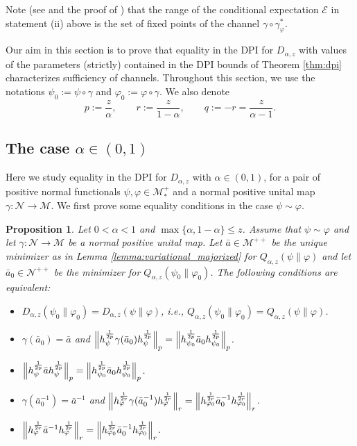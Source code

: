 \documentclass[12pt]{article}
\newtheorem{prop}[theorem]{Proposition}
\theoremstyle{definition}
\theoremstyle{remark}
\numberwithin{equation}{section}
\def\Me{\mathcal M}
\def\Ne{\mathcal N}
\def\ffi{\varphi}
\begin{document}
Note {(see \cite[Theorem 2]{petz1988sufficiency} and the proof of
\cite[Theorem 3]{petz1988sufficiency})}
that the range of the conditional expectation $\mathcal E$ in statement (ii) above is the set of
fixed points of the channel $\gamma\circ\gamma_\varphi^*$.


Our aim in this section is to prove that equality in the DPI for $D_{\alpha,z}$ with 
values of the parameters (strictly) contained in the DPI bounds of Theorem \ref{thm:dpi}
characterizes sufficiency of channels. Throughout this section, we use the
notations $\psi_0:=\psi\circ\gamma$ and $\ffi_0:=\ffi\circ\gamma$. We also denote
\[
p:=\frac{z}{\alpha},\qquad r:=\frac{z}{1-\alpha},\qquad q:=-r=\frac{z}{\alpha-1}. 
\]


\subsection{The case $\alpha\in (0,1)$}

Here we study equality in the DPI for $D_{\alpha,z}$ with $\alpha\in (0,1)$,  for a pair of positive
normal functionals $\psi,\ffi\in \Me_*^+$ and a normal positive unital map $\gamma:\Ne\to \Me$. We first
prove some equality conditions  in the case $\psi\sim \ffi$. 

\begin{prop}\label{prop:DPI_equality}
Let $0<\alpha<1$ and $\max\{\alpha,1-\alpha\}\le z$.  Assume that $\psi\sim \ffi$ and  let
$\gamma:\Ne\to \Me$ be a normal positive unital map. Let 
$\bar a\in \Me^{++}$  
be the unique minimizer as in Lemma \ref{lemma:variational_majorized} for
$Q_{\alpha,z}(\psi\|\ffi)$ and let $\bar a_0\in \Ne^{++}$ be the minimizer for
$Q_{\alpha,z}(\psi_0\|\ffi_0)$. The following conditions are equivalent:
\begin{itemize}
\item[(i)] $D_{\alpha,z}(\psi_0\|\ffi_0)=D_{\alpha,z}(\psi\|\ffi)$, i.e.,
$Q_{\alpha,z}(\psi_0\|\ffi_0)=Q_{\alpha,z}(\psi\|\ffi)$.
\item[(ii)] $\gamma(\bar a_0)=\bar a$ and
$\Big\|h_\psi^{1\over2p}\gamma(\bar a_0)h_\psi^{1\over2p}\Big\|_{p}
=\Big\|h_{\psi_0}^{1\over2p}\bar a_0h_{\psi_0}^{1\over2p}\Big\|_{p}$.
\item[(iii)] $\Big\|h_\psi^{1\over2p}\bar ah_\psi^{1\over2p}\Big\|_{p}
=\Big\|h_{\psi_0}^{1\over2p}\bar a_0h_{\psi_0}^{1\over2p}\Big\|_{p}$.
\item[(iv)] $\gamma(\bar a_0^{-1})=\bar a^{-1}$ and
$\Big\|h_\ffi^{1\over2r}\gamma(\bar a_0^{-1})h_\ffi^{1\over2r}\Big\|_{r}
=\Big\|h_{\ffi_0}^{1\over2r}\bar a_0^{-1}h_{\ffi_0}^{1\over2r}\Big\|_{r}$.
\item[(v)] $\Big\|h_\ffi^{1\over2r}\bar a^{-1}h_\ffi^{1\over2r}\Big\|_{r}
=\Big\|h_{\ffi_0}^{1\over2r}\bar a_0^{-1}h_{\ffi_0}^{1\over2r}\Big\|_{r}$.
\end{itemize}
\end{prop}
\end{document}
